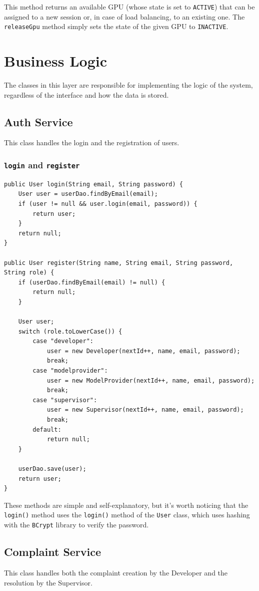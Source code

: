 \documentclass[a4paper,11pt]{report}
\begin{document}
	This method returns an available GPU (whose state is set to \texttt{ACTIVE}) that can be assigned to a new session or, in case of load balancing, to an existing one.
	The \texttt{releaseGpu} method simply sets the state of the given GPU to \texttt{INACTIVE}.
	
	\section{Business Logic}
	\label{sec:BusinessLogic}
	The classes in this layer are responsible for implementing the logic of the system, regardless of the interface and how the data is stored.
	\subsection{Auth Service}
	This class handles the login and the registration of users. 

\subsubsection{\texttt{login} and \texttt{register}}
\begin{lstlisting}[label={lst:authservice}]
public User login(String email, String password) {
	User user = userDao.findByEmail(email);
	if (user != null && user.login(email, password)) {
		return user;
	}
	return null;
}

public User register(String name, String email, String password, String role) {
	if (userDao.findByEmail(email) != null) {
		return null;
	}

	User user;
	switch (role.toLowerCase()) {
		case "developer":
			user = new Developer(nextId++, name, email, password);
			break;
		case "modelprovider":
			user = new ModelProvider(nextId++, name, email, password);
			break;
		case "supervisor":
			user = new Supervisor(nextId++, name, email, password);
			break;
		default:
			return null;
	}

	userDao.save(user);
	return user;
}
\end{lstlisting}
These methods are simple and self-explanatory, but it's worth noticing that the \texttt{login()} method uses the \texttt{login()} method of the \texttt{User} class, which uses hashing with the \texttt{BCrypt} library to verify the password.
\subsection{Complaint Service}
This class handles both the complaint creation by the Developer and the resolution by the Supervisor.
\end{document}
